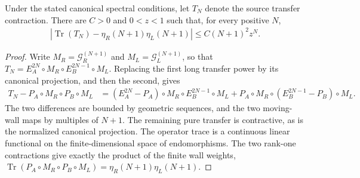 \begin{lemma}
    \label{lem:uncle_trial_norm_factorization_error}
    \leanok
    Under the stated canonical spectral conditions, let $T_N$ denote the
    source transfer contraction. There are $C>0$ and $0<z<1$ such
    that, for every positive $N$,
    \begin{align}
        \left|\operatorname{Tr}(T_N)-\eta_R(N+1)\eta_L(N+1)\right|
        \le C(N+1)^2z^N.
    \end{align}
\end{lemma}
\begin{proof}
    \leanok
    Write $M_R=\mathcal G_R^{(N+1)}$ and $M_L=\mathcal G_L^{(N+1)}$, so that
    $T_N=E_A^{2N}\circ M_R\circ E_B^{2N-1}\circ M_L$. Replacing the first
    long transfer power by its canonical projection, and then the second,
    gives
    \begin{align}
        T_N-P_A\circ M_R\circ P_B\circ M_L
         & =(E_A^{2N}-P_A)\circ M_R\circ E_B^{2N-1}\circ M_L
        +P_A\circ M_R\circ(E_B^{2N-1}-P_B)\circ M_L.
        \label{eq:uncle_trial_factorization_split}
    \end{align}
    The two differences are bounded by geometric sequences, and the two
    moving-wall maps by multiples of $N+1$. The remaining pure transfer is
    contractive, as is the normalized canonical projection. The operator trace is a continuous linear functional on
    the finite-dimensional space of endomorphisms. The two rank-one
    contractions give exactly the product of the finite wall weights,
    $\operatorname{Tr}(P_A\circ M_R\circ P_B\circ M_L)
        =\eta_R(N+1)\eta_L(N+1)$.
\end{proof}

